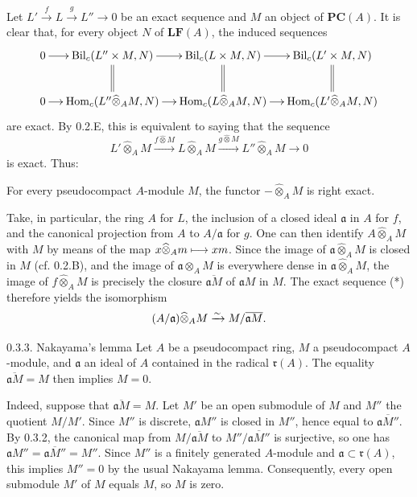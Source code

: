 Let $L'\xrightarrow{f}L\xrightarrow{g}L''\to0$ be an exact sequence and $M$ an object of $\mathbf{PC}(A)$. It is clear that, for every object $N$ of $\mathbf{LF}(A)$, the induced sequences
\[
\xymatrix@C=12pt{
0\ar[r]&\operatorname{Bil}_c(L''\times M,N)\ar[r]\ar@{=}[d]&\operatorname{Bil}_c(L\times M,N)\ar[r]\ar@{=}[d]&\operatorname{Bil}_c(L'\times M,N)\ar@{=}[d]\\
0\ar[r]&\Hom_c(L''\widehat\otimes_A M,N)\ar[r]&\Hom_c(L\widehat\otimes_A M,N)\ar[r]&\Hom_c(L'\widehat\otimes_A M,N)}
\]
are exact. By 0.2.E, this is equivalent to saying that the sequence
\begin{equation}\tag{*}
L'\widehat\otimes_A M\xrightarrow{f\widehat\otimes M}L\widehat\otimes_A M\xrightarrow{g\widehat\otimes M}L''\widehat\otimes_A M\to0
\end{equation}
is exact. Thus:
\begin{corollary}{}
For every pseudocompact $A$-module $M$, the functor $-\widehat\otimes_A M$ is right exact.
\end{corollary}
Take, in particular, the ring $A$ for $L$, the inclusion of a closed ideal $\mathfrak a$ in $A$ for $f$, and the canonical projection from $A$ to $A/\mathfrak a$ for $g$. One can then identify $A\widehat\otimes_A M$ with $M$ by means of the map $x\widehat\otimes_A m\longmapsto xm$. Since the image of $\mathfrak a\widehat\otimes_A M$ is closed in $M$ (cf. 0.2.B), and the image of $\mathfrak a\otimes_A M$ is everywhere dense in $\mathfrak a\widehat\otimes_A M$, the image of $f\widehat\otimes_A M$ is precisely the closure $\overline{\mathfrak aM}$ of $\mathfrak aM$ in $M$. The exact sequence (*) therefore yields the isomorphism
\[
(A/\mathfrak a)\widehat\otimes_A M\xrightarrow{\sim} M/\overline{\mathfrak aM}.
\]

\begin{enonce}{0.3.3. Nakayama's lemma}{}\label{VIIB.0.3.3}
Let $A$ be a pseudocompact ring, $M$ a pseudocompact $A$-module, and $\mathfrak a$ an ideal of $A$ contained in the radical $\mathfrak r(A)$. The equality $\overline{\mathfrak aM}=M$ then implies $M=0$.
\end{enonce}
Indeed, suppose that $\overline{\mathfrak aM}=M$. Let $M'$ be an open submodule of $M$ and $M''$ the quotient $M/M'$. Since $M''$ is discrete, $\mathfrak aM''$ is closed in $M''$, hence equal to $\overline{\mathfrak aM''}$. By 0.3.2, the canonical map from $M/\overline{\mathfrak aM}$ to $M''/\overline{\mathfrak aM''}$ is surjective, so one has $\mathfrak aM''=\overline{\mathfrak aM''}=M''$. Since $M''$ is a finitely generated $A$-module and $\mathfrak a\subset\mathfrak r(A)$, this implies $M''=0$ by the usual Nakayama lemma. Consequently, every open submodule $M'$ of $M$ equals $M$, so $M$ is zero.

